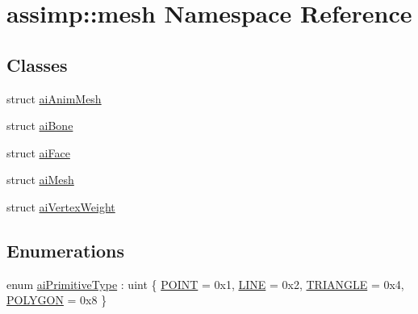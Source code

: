 \hypertarget{namespaceassimp_1_1mesh}{\section{assimp\+:\+:mesh Namespace Reference}
\label{namespaceassimp_1_1mesh}
}
\subsection*{Classes}
\begin{DoxyCompactItemize}
\item 
struct \hyperlink{structassimp_1_1mesh_1_1ai_anim_mesh}{ai\+Anim\+Mesh}
\item 
struct \hyperlink{structassimp_1_1mesh_1_1ai_bone}{ai\+Bone}
\item 
struct \hyperlink{structassimp_1_1mesh_1_1ai_face}{ai\+Face}
\item 
struct \hyperlink{structassimp_1_1mesh_1_1ai_mesh}{ai\+Mesh}
\item 
struct \hyperlink{structassimp_1_1mesh_1_1ai_vertex_weight}{ai\+Vertex\+Weight}
\end{DoxyCompactItemize}
\subsection*{Enumerations}
\begin{DoxyCompactItemize}
\item 
enum \hyperlink{namespaceassimp_1_1mesh_abc539dabedce7b606660c34e4bf55160}{ai\+Primitive\+Type} \+: uint \{ \hyperlink{namespaceassimp_1_1mesh_abc539dabedce7b606660c34e4bf55160a58249197e1431cde9593723f83a42ca4}{P\+O\+I\+N\+T} = 0x1, 
\hyperlink{namespaceassimp_1_1mesh_abc539dabedce7b606660c34e4bf55160a511c7a35e80fb98947066811053d6096}{L\+I\+N\+E} = 0x2, 
\hyperlink{namespaceassimp_1_1mesh_abc539dabedce7b606660c34e4bf55160ac2a455a7c72f8cb2aea05a3a811bf60c}{T\+R\+I\+A\+N\+G\+L\+E} = 0x4, 
\hyperlink{namespaceassimp_1_1mesh_abc539dabedce7b606660c34e4bf55160af2d4e1983182975c6ddd3381ce1a256c}{P\+O\+L\+Y\+G\+O\+N} = 0x8
 \}
\end{DoxyCompactItemize}
